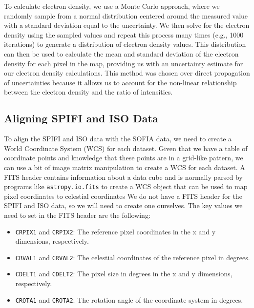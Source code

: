 To calculate electron density, we use a Monte Carlo approach, where we randomly sample from a normal distribution centered around the measured value with a standard deviation equal to the uncertainty.
We then solve for the electron density using the sampled values and repeat this process many times (e.g., 1000 iterations) to generate a distribution of electron density values.
This distribution can then be used to calculate the mean and standard deviation of the electron density for each pixel in the map, providing us with an uncertainty estimate for our electron density calculations.
This method was chosen over direct propagation of uncertainties because it allows us to account for the non-linear relationship between the electron density and the ratio of intensities.

\subsection{Aligning SPIFI and ISO Data}
\label{carina/sec:fits_fit}
To align the SPIFI and ISO data with the SOFIA data, we need to create a World Coordinate System (WCS) for each dataset.
Given that we have a table of coordinate points and knowledge that these points are in a grid-like pattern, we can use a bit of image matrix manipulation to create a WCS for each dataset.
A FITS header contains information about a data cube and is normally parsed by programs like \texttt{astropy.io.fits} to create a WCS object that can be used to map pixel coordinates to celestial coordinates \cite{}
We do not have a FITS header for the SPIFI and ISO data, so we will need to create one ourselves.
The key values we need to set in the FITS header are the following:
\begin{itemize}
    \item \texttt{CRPIX1} and \texttt{CRPIX2}: The reference pixel coordinates in the x and y dimensions, respectively.
    \item \texttt{CRVAL1} and \texttt{CRVAL2}: The celestial coordinates of the reference pixel in degrees.
    \item \texttt{CDELT1} and \texttt{CDELT2}: The pixel size in degrees in the x and y dimensions, respectively.
    \item \texttt{CROTA1} and \texttt{CROTA2}: The rotation angle of the coordinate system in degrees.
\end{itemize}

